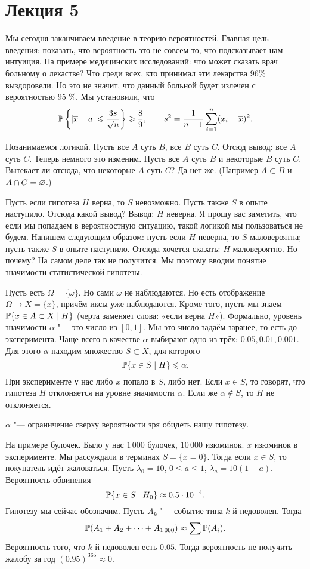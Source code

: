 \section{Лекция 5}
Мы сегодня заканчиваем введение в теорию вероятностей. Главная цель введения: показать, что вероятность это не совсем то, что подсказывает нам интуиция. На примере медицинских исследований: что может сказать врач больному о лекастве? Что среди всех, кто принимал эти лекарства 96\% выздоровели. Но это не значит, что данный больной будет излечен с вероятностью 95 \%. Мы установили, что
\[
  \P \left\{ |\ol x- a|\le\frac{3s}{\sqrt n}\right\} \ge \frac89,\qquad
s^2 = \frac1{n-1} \RY i1n (x_i-\ol x)^2.
\]

Позанимаемся логикой. Пусть все $A$ суть $B$, все $B$ суть $C$. Отсюд вывод: все $A$ суть $C$. Теперь немного это изменим. Пусть все $A$ суть $B$ и некоторые $B$ суть $C$. Вытекает ли отсюда, что некоторые $A$ суть $C$? Да нет же. (Например $A\subset B$ и $A\cap C=\q$.)

Пусть если гипотеза $H$ верна, то $S$ невозможно. Пусть также $S$ в опыте наступило. Отсюда какой вывод? Вывод: $H$ неверна. Я прошу вас заметить, что если мы попадаем в вероятностную ситуацию, такой логикой мы пользоваться не будем. Напишем следующим образом: пусть если $H$ неверна, то $S$ маловероятна; пусть также $S$ в опыте наступило. Отсюда хочется сказать: $H$ маловероятно. Но почему? На самом деле так не получится. Мы поэтому вводим понятие значимости статистической гипотезы.

Пусть есть $\Omega = \{\omega\}$. Но сами $\omega$ не наблюдаются. Но есть отображение $\Omega\to X=\{x\}$, причём иксы уже наблюдаются. Кроме того, пусть мы знаем $\P\{x\in A \subset X\mid H\}$ (черта заменяет слова: «если верна $H$»). Формально, уровень значимости $\alpha$ "--- это число из $[0,1]$. Мы это число задаём заранее, то есть до эксперимента. Чаще всего в качестве $\alpha$ выбирают одно из трёх: $0.05, 0.01, 0.001$. Для этого $\alpha$ находим множество $S\subset X$, для которого
\[
  \P\{x\in S\mid H\} \le \alpha.
\]
При эксперименте у нас либо $x$ попало в $S$, либо нет. Если $x\in S$, то говорят, что гипотеза $H$ отклоняется на уровне значимости $\alpha$. Если же $\alpha\not\in S$, то $H$ не отклоняется.

$\alpha$ "--- ограничение сверху вероятности зря обидеть нашу гипотезу.

На примере булочек. Было у нас $1\,000$ булочек, $10\,000$ изюминок. $x$ изюминок в эксперименте. Мы рассуждали в терминах $S = \{x=0\}$. Тогда если $x\in S$, то покупатель идёт жаловаться. Пусть $\lambda_0=10$, $0\le a\le 1$, $\lambda_a = 10(1-a)$. Вероятность обвинения
\[
  \P\{x\in S\mid H_0\} \approx 0.5\cdot 10^{-4}.
\]
Гипотезу мы сейчас обозначим. Пусть $A_k$ "--- событие типа $k$-й недоволен. Тогда
\[
  \P(A_1+A_2+\dots+A_{1\,000}) \approx \sum \P(A_i).
\]
Вероятность того, что $k$-й недоволен есть $0.05$. Тогда вероятность не получить жалобу за год $(0.95)^{365}\approx 0$.

